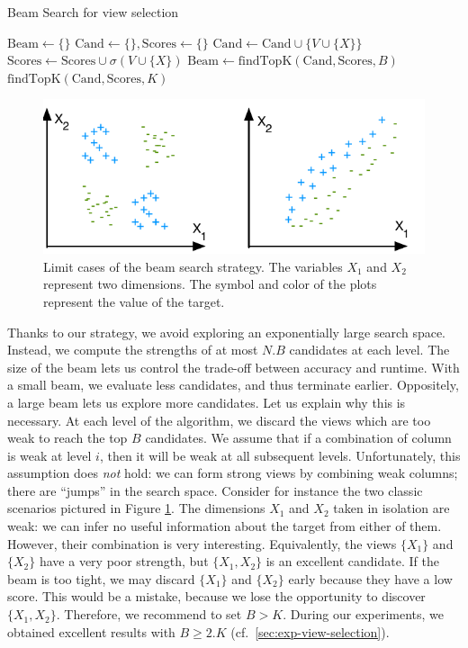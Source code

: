 \begin{algorithm}[t]
\caption{Beam Search for view selection}
\label{algo:beam_search}
\begin{algorithmic}
    \State $\text{Beam} \gets \{\}$
        \State $\text{Cand} \gets \{\}, \text{Scores} \gets \{\}$
            \State $\text{Cand} \gets \text{Cand} \cup \{V \cup \{X\} \}$
            \State $\text{Scores} \gets \text{Scores} \cup \sigma(V \cup \{X\}) $
            \EndFor
        \EndFor
        \State $\text{Beam} \gets \text{findTopK}(\text{Cand}, \text{Scores}, B)$
    \EndFor
    \State \Return $\text{findTopK}(\text{Cand}, \text{Scores}, K)$
    \EndFunction
\end{algorithmic}
\end{algorithm}
\begin{figure}[t!]
\centering
\includegraphics[width=0.7\columnwidth]{images/strength-jump}
\caption{Limit cases of the beam search strategy. The variables $X_1$ and
$X_2$ represent two dimensions. The symbol and color of the plots represent
the value of the target. }
\label{pic:strength-jump}
\end{figure}
Thanks to our strategy, we avoid exploring an exponentially large search
space. Instead, we compute the strengths of at most $N.B$ candidates at each
level. The size of the beam lets us control the trade-off between accuracy and
runtime. With a small beam, we evaluate less candidates, and thus terminate
earlier. Oppositely, a large beam lets us explore more candidates.  Let us
explain why this is necessary. At each level of the algorithm, we discard the
views which are too weak to reach the top $B$ candidates. We assume that if a
combination of column is weak at level $i$, then it will be weak at all
subsequent levels.  Unfortunately, this assumption does \emph{not} hold: we can
form strong views by combining weak columns; there are ``jumps'' in the search
space.  Consider for instance the two classic scenarios pictured in Figure
\ref{pic:strength-jump}.  The dimensions $X_1$ and $X_2$ taken in isolation are
weak: we can infer no useful information about the target from either of them.
However, their combination is very interesting. Equivalently, the views
$\{X_1\}$ and $\{X_2\}$ have a very poor strength, but $\{X_1, X_2\}$ is an
excellent candidate. If the beam is too tight, we may discard $\{X_1\}$ and
$\{X_2\}$ early because they have a low score.  This would be a mistake,
because we lose the opportunity to discover $\{X_1, X_2\}$. Therefore, we
recommend to set $B > K$. During our experiments, we obtained excellent results
with $B \geq 2.K$ (cf.~\ref{sec:exp-view-selection}).

